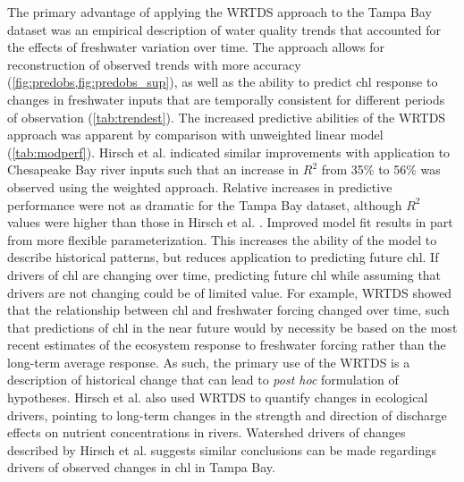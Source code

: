 \documentclass{svjour3}\usepackage[]{graphicx}\usepackage[]{color}
\begin{document}
The primary advantage of applying the \ac{WRTDS} approach to the Tampa Bay dataset was an empirical description of water quality trends that accounted for the effects of freshwater variation over time. The approach allows for reconstruction of observed trends  with more accuracy (\cref{fig:predobs,fig:predobs_sup}), as well as the ability to predict \ac{chl} response to changes in freshwater inputs that are temporally consistent for different periods of observation (\cref{tab:trendest}). The increased predictive abilities of the \ac{WRTDS} approach was apparent by comparison with unweighted linear model (\cref{tab:modperf}).  Hirsch et al. \cite{Hirsch10} indicated similar improvements with application to Chesapeake Bay river inputs such that an increase in $R^2$ from 35\% to 56\% was observed using the weighted approach.  Relative increases in predictive performance were not as dramatic for the Tampa Bay dataset, although $R^2$ values were higher than those in Hirsch et al. \cite{Hirsch10}.  Improved model fit results in part from more flexible parameterization.  This increases the ability of the model to describe historical patterns, but reduces application to predicting future \ac{chl}.  If drivers of \ac{chl} are changing over time, predicting future \ac{chl} while assuming that drivers are not changing could be of limited value.  For example, \ac{WRTDS} showed that the relationship between \ac{chl} and freshwater forcing changed over time, such that predictions of \ac{chl} in the near future would by necessity be based on the most recent estimates of the ecosystem response to freshwater forcing rather than the long-term average response.  As such, the primary use of the \ac{WRTDS} is a description of historical change that can lead to \textit{post hoc} formulation of hypotheses.  Hirsch et al. \cite{Hirsch10} also used WRTDS to quantify changes in ecological drivers, pointing to long-term changes in the strength and direction of discharge effects on nutrient concentrations in rivers.  Watershed drivers of changes described by Hirsch et al. \cite{Hirsch10} suggests similar conclusions can be made regardings drivers of observed changes in \ac{chl} in Tampa Bay.  
\end{document}
